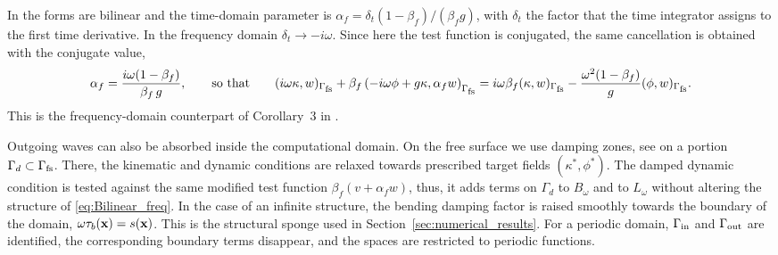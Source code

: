 \begin{remark}\label{rem:alpha_f}
In \cite{colomes2023monolithic} the forms are bilinear and the time-domain parameter is $\alpha_f=\delta_t(1-\beta_f)/(\beta_f g)$, with $\delta_t$ the factor that the time integrator assigns to the first time derivative. In the frequency domain $\delta_t\to-i\omega$. Since here the test function is conjugated, the same cancellation is obtained with the conjugate value,
\begin{equation}\label{eq:alpha_f}
    \alpha_f = \frac{i\omega(1-\beta_f)}{\beta_f\,g},
    \qquad\text{so that}\qquad
    (i\omega\kappa,w)_{\Gamma_{\mbox{\scriptsize fs}}}+\beta_f\left(-i\omega\phi+g\kappa,\alpha_f w\right)_{\Gamma_{\mbox{\scriptsize fs}}}
    =i\omega\beta_f(\kappa,w)_{\Gamma_{\mbox{\scriptsize fs}}}-\frac{\omega^2(1-\beta_f)}{g}(\phi,w)_{\Gamma_{\mbox{\scriptsize fs}}}.
\end{equation}
This is the frequency-domain counterpart of Corollary~3 in \cite{colomes2023monolithic}.
\end{remark}

Outgoing waves can also be absorbed inside the computational domain. On the free surface we use damping zones, see \cite{colomes2023monolithic,agarwal2024dynamic} on a portion $\Gamma_d\subset\Gamma_{\mbox{\scriptsize fs}}$. There, the kinematic and dynamic conditions are relaxed towards prescribed target fields $(\kappa^*,\phi^*)$. The damped dynamic condition is tested against the same modified test function $\beta_f(v+\alpha_f w)$, thus, it adds terms on $\Gamma_d$ to $B_\omega$ and to $L_\omega$ without altering the structure of \eqref{eq:Bilinear_freq}. In the case of an infinite structure, the bending damping factor is raised smoothly towards the boundary of the domain, $\omega\tau_b(\mathbf{x})=s(\mathbf{x})$. This is the structural sponge used in Section~\ref{sec:numerical_results}. For a periodic domain, $\Gamma_{\mbox{\scriptsize in}}$ and $\Gamma_{\mbox{\scriptsize out}}$ are identified, the corresponding boundary terms disappear, and the spaces are restricted to periodic functions.

